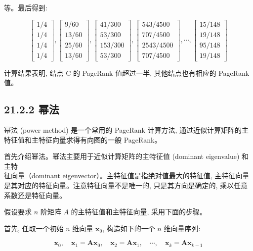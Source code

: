\documentclass[10pt]{article}
\begin{document}
\begin{CJK*}{UTF8}{bsmi}
等。最后得到:

$$
\left[\begin{array}{c}
1 / 4 \\
1 / 4 \\
1 / 4 \\
1 / 4
\end{array}\right],\left[\begin{array}{c}
9 / 60 \\
13 / 60 \\
25 / 60 \\
13 / 60
\end{array}\right],\left[\begin{array}{c}
41 / 300 \\
53 / 300 \\
153 / 300 \\
53 / 300
\end{array}\right],\left[\begin{array}{c}
543 / 4500 \\
707 / 4500 \\
2543 / 4500 \\
707 / 4500
\end{array}\right], \cdots,\left[\begin{array}{c}
15 / 148 \\
19 / 148 \\
95 / 148 \\
19 / 148
\end{array}\right]
$$

计算结果表明, 结点 C 的 PageRank 值超过一半, 其他结点也有相应的 PageRank 值。

\subsection*{21.2.2 幂法}
幂法 (power method) 是一个常用的 PageRank 计算方法, 通过近似计算矩阵的主特征值和主特征向量求得有向图的一般 PageRank。

首先介绍幂法。幂法主要用于近似计算矩阵的主特征值 (dominant eigenvalue) 和主特\\
征向量（dominant eigenvector）。主特征值是指绝对值最大的特征值, 主特征向量是其对应的特征向量。注意特征向量不是唯一的, 只是其方向是确定的, 乘以任意系数还是特征向量。

假设要求 $n$ 阶矩阵 $A$ 的主特征值和主特征向量, 采用下面的步骤。

首先, 任取一个初始 $n$ 维向量 $\boldsymbol{x}_{0}$, 构造如下的一个 $n$ 维向量序列:

$$
\boldsymbol{x}_{0}, \quad \boldsymbol{x}_{1}=\boldsymbol{A} \boldsymbol{x}_{0}, \quad \boldsymbol{x}_{2}=\boldsymbol{A} \boldsymbol{x}_{1}, \quad \cdots, \quad \boldsymbol{x}_{k}=\boldsymbol{A} \boldsymbol{x}_{k-1}
$$


\end{CJK*}
\end{document}
